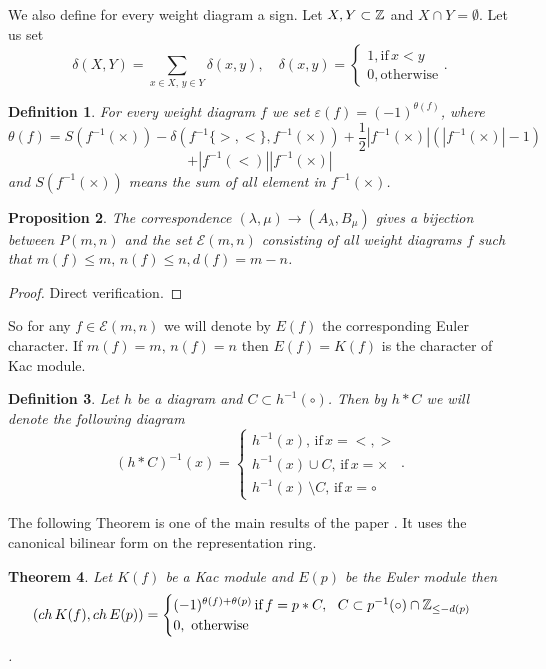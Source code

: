 \documentclass[12pt,reqno]{amsart}
\newtheorem{thm}{Theorem}[section]
\newtheorem{proposition}[thm]{Proposition}
\newtheorem{definition}[thm]{Definition}
\begin{document}
 We also define  for  every weight diagram  a sign. 
 Let $X,Y\subset\Bbb Z$ and $X\cap Y=\emptyset$.  Let us set
$$
\delta(X,Y)=\sum_{x\in X,\,y\in Y}\delta(x,y),\quad \delta(x,y)=\begin{cases} 1,\text{if}\, x<y\\
0,\text{otherwise}
\end{cases}.
$$
\begin{definition}
For every  weight diagram $f$ we set $\varepsilon(f)=(-1)^{\theta(f)}$, where 
$$
\theta(f)=S(f^{-1}(\times))-\delta(f^{-1}\{>,<\},f^{-1}(\times))+
\frac12|f^{-1}(\times)|(|f^{-1}(\times)|-1)
$$
$$
+|f^{-1}(<)||f^{-1}(\times)| 
$$
and $S(f^{-1}(\times))$ means the sum of all element in $f^{-1}(\times)$.
\end{definition}
 
\begin{proposition}  The correspondence  
$
(\lambda,\mu)\rightarrow (A_{\lambda}, B_{\mu})
$
gives a bijection between $P(m,n)$ and the set $\mathcal E(m,n)$  consisting of all  weight diagrams $f$ such that $m(f)\le m,\,n(f)\le n, d(f)=m-n$.
\end{proposition}
\begin{proof} Direct verification.
\end{proof}
So for any $f\in\mathcal E(m,n)$ we will denote by $E(f)$ the corresponding Euler character. If $m(f)=m,\,n(f)=n$ then $E(f)=K(f)$ is the character of Kac module.



 
  



 

 
 


\begin{definition} Let $h$ be a diagram and $C\subset h^{-1}(\circ)$. Then by $h*C$ we will denote  the following diagram
$$
(h*C)^{-1}(x)=\begin{cases}
h^{-1}(x),\,\text{if}\,x=<,>\\
h^{-1}(x)\cup C,\, \text{if} \,x=\times\\
h^{-1}(x)\,\setminus C,\,\text{if}\, x=\circ
\end{cases}.
$$
\end{definition}

 The following Theorem is one of the main results of the paper  \cite{Ser3}. It uses the canonical bilinear form on the representation ring.
\begin{thm} \label{KacEuler} Let $K(f)$ be a Kac module and $E(p)$ be the Euler module then
\begin{equation}\label{main1}
(ch\,K(f),ch\, E(p))=\begin{cases}(-1)^{\theta(f)+\theta(p)}\, \text{if}\,f=p*C,\,\,\, \,C\subset p^{-1}({\circ})\cap\Bbb Z_{\le -d(p)}\\
0,\,\,\text{otherwise}
\end{cases}\end{equation}.
 \end{thm}
\end{document}
